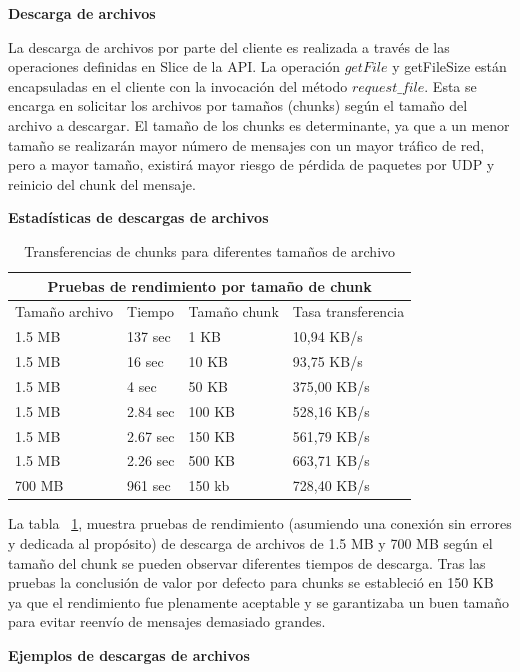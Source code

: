 \textbf{Descarga de archivos}

La descarga de archivos por parte del cliente es realizada a través de las
operaciones definidas en Slice de la API. La operación $getFile$ y getFileSize
están encapsuladas en el cliente con la invocación del método $request\_file$.
Esta se encarga en solicitar los archivos por tamaños (chunks) según el tamaño
del archivo a descargar. El tamaño de los chunks es determinante, ya que a un
menor tamaño se realizarán mayor número de mensajes con un mayor tráfico de red,
pero a mayor tamaño, existirá mayor riesgo de pérdida de paquetes por UDP y
reinicio del chunk del mensaje.

\textbf{Estadísticas de descargas de archivos}

\begin{table}[ht]
    \centering
    \begin{tabular}{|l|l|l|l|}
      \hline
      \multicolumn{4}{|c|}{Pruebas de rendimiento por tamaño de chunk} \\
      \hline
        Tamaño archivo &  Tiempo & Tamaño chunk & Tasa transferencia\\
        1.5 MB & 137 sec  & 1 KB   &  10,94 KB/s \\
        1.5 MB &   16 sec & 10 KB  &  93,75 KB/s \\ 
        1.5 MB &    4 sec & 50 KB  & 375,00 KB/s \\
        1.5 MB & 2.84 sec & 100 KB & 528,16 KB/s \\
        1.5 MB & 2.67 sec & 150 KB & 561,79 KB/s \\
        1.5 MB & 2.26 sec & 500 KB & 663,71 KB/s \\
        700 MB &  961 sec & 150 kb & 728,40 KB/s \\
      \hline
    \end{tabular}
    \caption{Transferencias de chunks para diferentes tamaños de archivo}
     \label{tab:chunkstimes}
\end{table}

La tabla ~\ref{tab:chunkstimes}, muestra pruebas de rendimiento (asumiendo una
conexión sin errores y dedicada al propósito) de descarga de archivos de 1.5 MB y 700 MB
según el tamaño del chunk se pueden observar diferentes tiempos de 
descarga. Tras las pruebas la conclusión de valor por defecto para chunks se
estableció en 150 KB ya que el rendimiento fue plenamente aceptable y se 
garantizaba un buen tamaño para evitar reenvío de mensajes demasiado grandes.

\textbf{Ejemplos de descargas de archivos}

